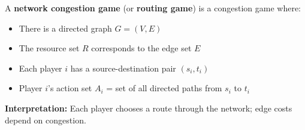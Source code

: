 \begin{defbox}
A \textbf{network congestion game} (or \textbf{routing game}) is a congestion game where:

\begin{itemize}
  \item There is a directed graph $G = (V, E)$
  \item The resource set $R$ corresponds to the edge set $E$
  \item Each player $i$ has a source-destination pair $(s_i, t_i)$
  \item Player $i$'s action set $A_i$ = set of all directed paths from $s_i$ to $t_i$
\end{itemize}

\textbf{Interpretation:} Each player chooses a route through the network; edge costs depend on congestion.
\end{defbox}

